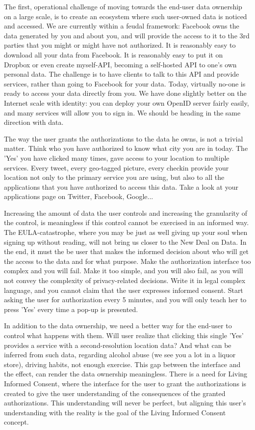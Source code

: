 The first, operational challenge of moving towards the end-user data ownership on a large scale, is to create an ecosystem where such user-owned data is noticed and accessed.
We are currently within a feudal framework: Facebook owns the data generated by you and about you, and will provide the access to it to the 3rd parties that you might or might have not authorized. 
It is reasonably easy to download all your data from Facebook. 
It is reasonably easy to put it on Dropbox or even create myself-API, becoming a self-hosted API to one's own personal data. 
The challenge is to have clients to talk to this API and provide services, rather than going to Facebook for your data. 
Today, virtually no-one is ready to access your data directly from you. 
We have done slightly better on the Internet scale with identity: you can deploy your own OpenID server fairly easily, and many services will allow you to sign in. We should be heading in the same direction with data.

The way the user grants the authorizations to the data he owns, is not a trivial matter.
Think who you have authorized to know what city you are in today. 
The 'Yes' you have clicked many times, gave access to your location to multiple services.
Every tweet, every geo-tagged picture, every checkin provide your location not only to the primary service you are using, but also to all the applications that you have authorized to access this data.
Take a look at your applications page on Twitter, Facebook, Google...

Increasing the amount of data the user controls and increasing the granularity of the control, is meaningless if this control cannot be exercised in an informed way.
The EULA-catastrophe, where you may be just as well giving up your soul when signing up without reading, will not bring us closer to the New Deal on Data.
In the end, it must the be user that makes the informed decision about who will get the access to the data and for what purpose. 
Make the authorization interface too complex and you will fail. 
Make it too simple, and you will also fail, as you will not convey the complexity of privacy-related decisions. 
Write it in legal complex language, and you cannot claim that the user expresses informed consent. 
Start asking the user for authorization every 5 minutes, and you will only teach her to press 'Yes' every time a pop-up is presented. 

In addition to the data ownership, we need a better way for the end-user to control what happens with them. 
Will user realize that clicking this single 'Yes' provides a service with a second-resolution location data? 
And what can be inferred from such data, regarding alcohol abuse (we see you a lot in a liquor store), driving habits, not enough exercise. 
This gap between the interface and the effect, can render the data ownership meaningless. 
There is a need for Living Informed Consent, where the interface for the user to grant the authorizations is created to give the user understanding of the consequences of the granted authorizations.
This understanding will never be perfect, but aligning this user's understanding with the reality is the goal of the Living Informed Consent concept. 

